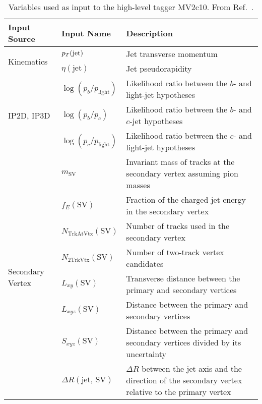 \begin{table}[!htb]
    \caption{
        Variables used as input to the high-level tagger MV2c10.
        From Ref.~\cite{ATL-PHYS-PUB-2015-022}.
    }
    \label{tab:ftag_mv2_inputs}
    \begin{scriptsize}
    \begin{center}
    \begin{tabularx}{\textwidth}{|X|l|X|}
    \hline
    \hline
    \textbf{Input Source} & \textbf{Input Name} & \textbf{Description} \\
    \hline
    \multirow{2}{*}{Kinematics} & $p_{T}(\text{jet})$ & Jet transverse momentum \\
    \cline{2-3}
                & $\eta(\text{jet})$ & Jet pseudorapidity \\
    \hline
    \multirow{3}{*}{IP2D, IP3D} & $\log(p_b/p_{\text{light}})$ & Likelihood ratio between the $b$- and light-jet hypotheses \\
    \cline{2-3}
                & $\log(p_b / p_c)$ & Likelihood ratio between the $b$- and $c$-jet hypotheses \\
    \cline{2-3}
                & $\log(p_c / p_{\text{light}})$ & Likelihood ratio between the $c$- and light-jet hypotheses \\
    \hline
    \multirow{8}{*}{Secondary Vertex} & $m_{\text{SV}}$ & Invariant mass of tracks at the secondary vertex assuming pion masses \\
    \cline{2-3}
            & $f_E(\text{SV})$ & Fraction of the charged jet energy in the secondary vertex \\
    \cline{2-3}
            & $N_{\text{TrkAtVtx}}(\text{SV})$ & Number of tracks used in the secondary vertex \\
    \cline{2-3}
            & $N_{\text{2TrkVtx}}(\text{SV})$ & Number of two-track vertex candidates \\
    \cline{2-3}
            & $L_{xy}(\text{SV})$ & Transverse distance between the primary and secondary vertices \\
    \cline{2-3}
            & $L_{xyz}(\text{SV})$ & Distance between the primary and secondary vertices \\
    \cline{2-3}
            & $S_{xyz}(\text{SV})$ & Distance between the primary and secondary vertices divided by its uncertainty \\
    \cline{2-3}
            & $\Delta R(\text{jet, SV})$ & $\Delta R$ between the jet axis and the direction of the secondary vertex relative to the primary vertex \\

\end{tabularx}
\end{center}
\end{scriptsize}
\end{table}
